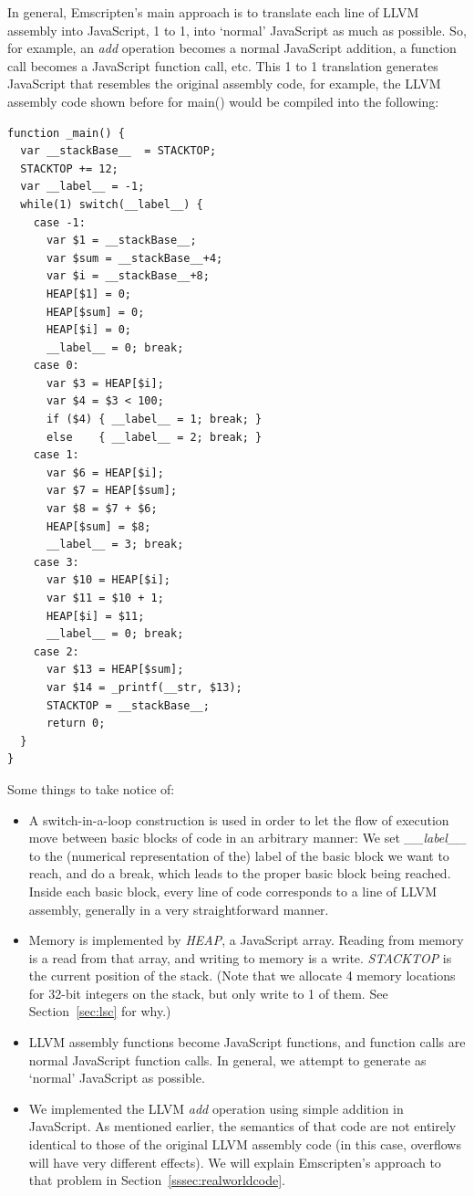 \documentclass[preprint,10pt]{sigplanconf}
\begin{document}
In general, Emscripten's main approach is to translate each line of LLVM
assembly into JavaScript, 1 to 1, into `normal' JavaScript
as much as possible. So, for example, an \emph{add} operation becomes
a normal JavaScript addition, a function call becomes a JavaScript
function call, etc. This 1 to 1 translation generates JavaScript
that resembles the original assembly code, for example, the LLVM assembly code shown
before for main() would be compiled into the following:
\label{code:example}
\begin{verbatim}
function _main() {
  var __stackBase__  = STACKTOP;
  STACKTOP += 12;
  var __label__ = -1;
  while(1) switch(__label__) {
    case -1:
      var $1 = __stackBase__;
      var $sum = __stackBase__+4;
      var $i = __stackBase__+8;
      HEAP[$1] = 0;
      HEAP[$sum] = 0;
      HEAP[$i] = 0;
      __label__ = 0; break;
    case 0:
      var $3 = HEAP[$i];
      var $4 = $3 < 100;
      if ($4) { __label__ = 1; break; }
      else    { __label__ = 2; break; }
    case 1:
      var $6 = HEAP[$i];
      var $7 = HEAP[$sum];
      var $8 = $7 + $6;
      HEAP[$sum] = $8;
      __label__ = 3; break;
    case 3:
      var $10 = HEAP[$i];
      var $11 = $10 + 1;
      HEAP[$i] = $11;
      __label__ = 0; break;
    case 2:
      var $13 = HEAP[$sum];
      var $14 = _printf(__str, $13);
      STACKTOP = __stackBase__;
      return 0;
  }
}
\end{verbatim}
Some things
to take notice of:
\begin{itemize}
\item A switch-in-a-loop construction is used in order to let the flow
      of execution move between basic blocks of code in an arbitrary manner: We set
      \emph{\_\_label\_\_} to the (numerical representation of the) label of
      the basic block we want to reach, and do a break, which leads to the proper
      basic block being reached. Inside each basic block, every line of code corresponds to a line of
      LLVM assembly, generally in a very straightforward manner. 
\item Memory is implemented by \emph{HEAP}, a JavaScript array. Reading from
      memory is a read from that array, and writing to memory is a write.
      \emph{STACKTOP} is the current position of the stack. (Note that we
      allocate 4 memory locations for 32-bit integers on the stack, but only 
      write to 1 of them. See Section~\ref{sec:lsc} for why.)
\item LLVM assembly functions become JavaScript functions, and function calls
      are normal JavaScript function calls. In general, we attempt to generate
      as `normal' JavaScript as possible.
\item We implemented the LLVM \emph{add} operation using simple addition in JavaScript.
      As mentioned earlier, the semantics of that code are not entirely identical to
      those of the original LLVM assembly code (in this case, overflows will have very
      different effects). We will explain Emscripten's approach to that problem in
      Section~\ref{sssec:realworldcode}.
\end{itemize}
\end{document}
